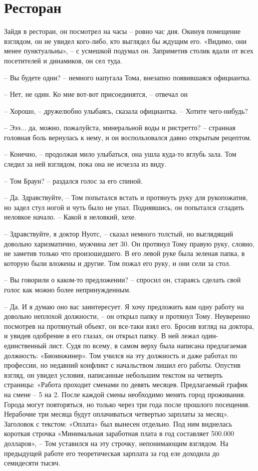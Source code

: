 \chapter{Ресторан}
\lettrine{З}{}айдя в ресторан, он посмотрел на часы – ровно час дня. Окинув помещение взглядом, он не увидел кого-либо, кто выглядел бы ждущим его. «Видимо, они менее пунктуальны», – с усмешкой подумал он. Заприметив столик вдали от всех посетителей и динамиков, он сел туда.

– Вы будете одни? – немного напугала Тома, внезапно появившаяся официантка. 

– Нет, не один. Ко мне вот-вот присоединятся, – отвечал он

– Хорошо, – дружелюбно улыбаясь, сказала официантка. – Хотите чего-нибудь?

– Эээ... да, можно, пожалуйста, минеральной воды и ристретто? – странная головная боль вернулась к нему, и он воспользовался давно открытым рецептом.  

– Конечно, – продолжая мило улыбаться, она ушла куда-то вглубь зала. Том следил за ней взглядом, пока она не исчезла из виду. 

– Том Браун? – раздался голос за его спиной.

– Да. Здравствуйте, – Том попытался встать и протянуть руку для рукопожатия, но задел стул ногой и чуть было не упал. Поднявшись, он попытался сгладить неловкое начало. – Какой я неловкий, хехе. 

– Здравствуйте, я доктор Нуотс, – сказал немного толстый, но выглядящий довольно харизматично, мужчина лет 30. Он протянул Тому правую руку, словно, не заметив только что произошедшего. В его левой руке была зеленая папка, в которую были вложены и другие. Том пожал его руку, и они сели за стол. 

– Вы говорили о каком-то предложении? – спросил он, стараясь сделать свой голос как можно более непринужденным. 

– Да. И я думаю оно вас заинтересует. Я хочу предложить вам одну работу на довольно неплохой должности, – он открыл папку и протянул Тому. Неуверенно посмотрев на протянутый объект, он все-таки взял его. Бросив взгляд на доктора, и увидев одобрение в его глазах, он открыл папку. В ней лежал один-единственный лист. Судя по всему, в самом верху была написана предлагаемая должность: «Биоинжинер». Том учился на эту должность и даже работал по профессии, но недавний конфликт с начальством лишил его работы. Опустив взгляд, он увидел условия, написанные небольшим текстом на четверть страницы: «Работа проходит сменами по девять месяцев. Предлагаемый график на смене – 5 на 2. После каждой смены необходимо менять город проживания. Города могут повторяться, но только через три года после прошлого посещения. Нерабочие три месяца будут оплачиваться четвертью зарплаты за месяц». Заголовок с текстом: «Оплата» был вынесен отдельно. Под ним виднелась короткая строчка «Минимальная заработная плата в год составляет 500.000 долларов», – Том уставился на эту строчку, непонимающим взглядом. На предыдущей работе его теоретическая зарплата за год еле доходила до семидесяти тысяч. 

